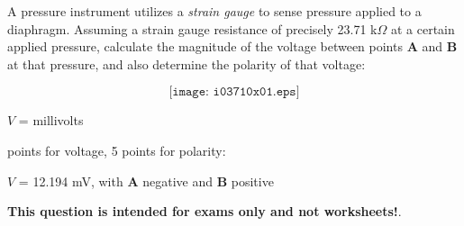 

A pressure instrument utilizes a {\it strain gauge} to sense pressure applied to a diaphragm.  Assuming a strain gauge resistance of precisely 23.71 k$\Omega$ at a certain applied pressure, calculate the magnitude of the voltage between points {\bf A} and {\bf B} at that pressure, and also determine the polarity of that voltage:

$$\texttt{[image: i03710x01.eps]}$$

\vskip 10pt

$V$ = \underbar{\hskip 50pt} millivolts







 points for voltage, 5 points for polarity:

\vskip 10pt

$V$ = 12.194 mV, with {\bf A} negative and {\bf B} positive







{\bf This question is intended for exams only and not worksheets!}.



